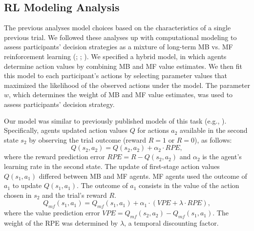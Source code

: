\documentclass[11pt]{article} %
\begin{document}
\subsection{RL Modeling Analysis}
The previous analyses model choices based on the characteristics of a single previous trial. We followed these analyses up with computational modeling to assess participants' decision strategies as a mixture of long-term MB vs. MF reinforcement learning (\cite{akam_simple_2015}; \cite{daw_model-based_2011}; \cite{sutton_reinforcement_2017}). We specified a hybrid model, in which agents determine action values by combining MB and MF value estimates. We then fit this model to each participant's actions by selecting parameter values that maximized the likelihood of the observed actions under the model. The parameter $w$, which determines the weight of MB and MF value estimates, was used to assess participants' decision strategy.

Our model was similar to previously published models of this task (e.g., \cite{wunderlich_dopamine_2012}). Specifically, agents updated action values $Q$ for actions $a_{2}$ available in the second state $s_{2}$ by observing the trial outcome (reward $R = 1$ or $R = 0$), as follows:
%
\begin{equation}
Q(s_{2}, a_{2}) = Q(s_{2}, a_{2}) + \alpha_{2} \cdot RPE,
\end{equation}
%
where the reward prediction error $RPE = R - Q(s_{2}, a_{2})$ and $\alpha_{2}$ is the agent's learning rate in the second state. The update of first-stage action values $Q(s_{1}, a_{1})$ differed between MB and MF agents. MF agents used the outcome of $a_{1}$ to update $Q(s_{1}, a_{1})$. The outcome of $a_{1}$ consists in the value of the action chosen in $s_{2}$ and the trial's reward $R$.
%
\begin{equation}
Q_{mf}(s_{1}, a_{1}) = Q_{mf}(s_{1}, a_{1}) + \alpha_{1} \cdot (VPE + \lambda \cdot RPE),
\end{equation}
%
where the value prediction error $VPE = Q_{mf}(s_{2}, a_{2}) - Q_{mf}(s_{1}, a_{1})$. The weight of the RPE was determined by $\lambda$, a temporal discounting factor.
\end{document}
